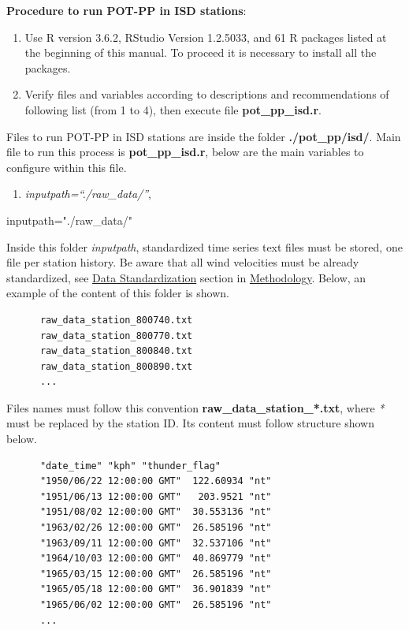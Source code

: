 \documentclass[12pt,oneside]{reedthesis}
\newenvironment{Shaded}{\begin{snugshade}}{\end{snugshade}}
\newcommand{\NormalTok}[1]{#1}
\newcommand{\StringTok}[1]{\textcolor[rgb]{0.31,0.60,0.02}{#1}}
\providecommand{\tightlist}{%
  \setlength{\itemsep}{0pt}\setlength{\parskip}{0pt}}
\begin{document}
\textbf{Procedure to run POT-PP in ISD stations}:
\begin{enumerate}
\def\labelenumi{\arabic{enumi}.}
\item
  Use R version 3.6.2, RStudio Version 1.2.5033, and 61 R packages listed at the beginning of this manual. To proceed it is necessary to install all the packages.
\item
  Verify files and variables according to descriptions and recommendations of following list (from 1 to 4), then execute file \textbf{pot\_pp\_isd.r}.
\end{enumerate}
Files to run POT-PP in ISD stations are inside the folder \textbf{./pot\_pp/isd/}. Main file to run this process is \textbf{pot\_pp\_isd.r}, below are the main variables to configure within this file.
\begin{enumerate}
\def\labelenumi{\arabic{enumi}.}
\tightlist
\item
  \emph{inputpath=``./raw\_data/''},
\end{enumerate}
\begin{Shaded}
\begin{Highlighting}[]
\NormalTok{inputpath=}\StringTok{"./raw_data/"}
\end{Highlighting}
\end{Shaded}
Inside this folder \emph{inputpath}, standardized time series text files must be stored, one file per station history. Be aware that all wind velocities must be already standardized, see \protect\hyperlink{rmd-standardization}{Data Standardization} section in \protect\hyperlink{rmd-method}{Methodology}. Below, an example of the content of this folder is shown.
\begin{verbatim}
      raw_data_station_800740.txt
      raw_data_station_800770.txt
      raw_data_station_800840.txt
      raw_data_station_800890.txt
      ...
\end{verbatim}
Files names must follow this convention \textbf{raw\_data\_station\_*.txt}, where \emph{*} must be replaced by the station ID. Its content must follow structure shown below.
\begin{verbatim}
      "date_time" "kph" "thunder_flag"
      "1950/06/22 12:00:00 GMT"  122.60934 "nt"
      "1951/06/13 12:00:00 GMT"   203.9521 "nt"
      "1951/08/02 12:00:00 GMT"  30.553136 "nt"
      "1963/02/26 12:00:00 GMT"  26.585196 "nt"
      "1963/09/11 12:00:00 GMT"  32.537106 "nt"
      "1964/10/03 12:00:00 GMT"  40.869779 "nt"
      "1965/03/15 12:00:00 GMT"  26.585196 "nt"
      "1965/05/18 12:00:00 GMT"  36.901839 "nt"
      "1965/06/02 12:00:00 GMT"  26.585196 "nt"
      ...
\end{verbatim}
\end{document}
